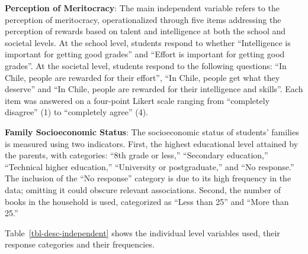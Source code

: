 \documentclass[
  12pt,
  letterpaper,
]{article}
\begin{document}
\textbf{Perception of Meritocracy}: The main independent variable refers
to the perception of meritocracy, operationalized through five items
addressing the perception of rewards based on talent and intelligence at
both the school and societal levels. At the school level, students
respond to whether ``Intelligence is important for getting good grades''
and ``Effort is important for getting good grades''. At the societal
level, students respond to the following questions: ``In Chile, people
are rewarded for their effort'', ``In Chile, people get what they
deserve'' and ``In Chile, people are rewarded for their intelligence and
skills''. Each item was answered on a four-point Likert scale ranging
from ``completely disagree'' (1) to ``completely agree'' (4).

\textbf{Family Socioeconomic Status}: The socioeconomic status of
students' families is measured using two indicators. First, the highest
educational level attained by the parents, with categories: ``8th grade
or less,'' ``Secondary education,'' ``Technical higher education,''
``University or postgraduate,'' and ``No response.'' The inclusion of
the ``No response'' category is due to its high frequency in the data;
omitting it could obscure relevant associations. Second, the number of
books in the household is used, categorized as ``Less than 25'' and
``More than 25.''

Table~\ref{tbl-desc-independent} shows the individual level variables
used, their response categories and their frequencies.
\end{document}
